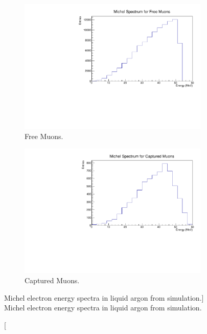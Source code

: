 \begin{figure}

	\centering
	\begin{subfigure}[b]{0.7\textwidth}
		\centering
		\includegraphics[width=\textwidth]{figures/michel_spec_free.pdf}
		\caption {Free Muons.}
		\label{fig:michel_spec_free}
	\end{subfigure}
	\begin{subfigure}[b]{0.7\textwidth}
		\centering
		\includegraphics[width=\textwidth]{figures/michel_spec_cap.pdf}
		\caption {Captured Muons.}
		\label{fig:michel_spec_cap}
	\end{subfigure}

	\caption
	[Michel electron energy spectra in liquid argon from \protodune{} simulation.]
	{Michel electron energy spectra in liquid argon from \protodune{} simulation.}

	\label{fig:michel_spec}

\end{figure}

